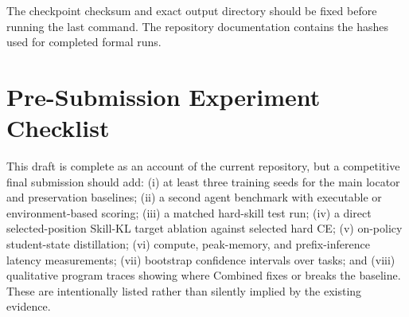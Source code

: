 The checkpoint checksum and exact output directory should be fixed before running the last command.  The repository documentation contains the hashes used for completed formal runs.

\section{Pre-Submission Experiment Checklist}
\label{app:todo}

This draft is complete as an account of the current repository, but a competitive final submission should add: (i) at least three training seeds for the main locator and preservation baselines; (ii) a second agent benchmark with executable or environment-based scoring; (iii) a matched hard-skill test run; (iv) a direct selected-position Skill-KL target ablation against selected hard CE; (v) on-policy student-state distillation; (vi) compute, peak-memory, and prefix-inference latency measurements; (vii) bootstrap confidence intervals over tasks; and (viii) qualitative program traces showing where Combined fixes or breaks the baseline.  These are intentionally listed rather than silently implied by the existing evidence.

